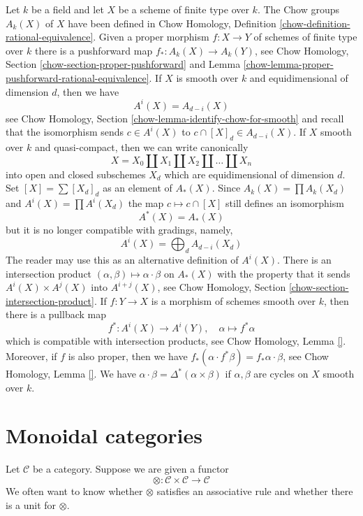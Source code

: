 \medskip\noindent
Let $k$ be a field and let $X$ be a scheme of finite type over $k$.
The Chow groups $A_k(X)$ of $X$ have been defined in
Chow Homology, Definition \ref{chow-definition-rational-equivalence}.
Given a proper morphism $f : X \to Y$ of schemes of finite
type over $k$ there is a pushforward map $f_* : A_k(X) \to A_k(Y)$,
see Chow Homology, Section \ref{chow-section-proper-pushforward} and
Lemma \ref{chow-lemma-proper-pushforward-rational-equivalence}.
If $X$ is smooth over $k$ and equidimensional of dimension $d$, then
we have
$$
A^i(X) = A_{d - i}(X)
$$
see Chow Homology, Section \ref{chow-lemma-identify-chow-for-smooth}
and recall that the isomorphism sends $c \in A^i(X)$ to
$c \cap [X]_d \in A_{d - i}(X)$.
If $X$ smooth over $k$ and quasi-compact, then we can write canonically
$$
X = X_0 \amalg X_1 \amalg X_2 \amalg \ldots \amalg X_n
$$
into open and closed subschemes $X_d$ which are
equidimensional of dimension $d$. Set $[X] = \sum [X_d]_d$
as an element of $A_*(X)$. Since
$A_k(X) = \prod A_k(X_d)$ and $A^i(X) = \prod A^i(X_d)$
the map $c \mapsto c \cap [X]$ still defines an isomorphism
$$
A^*(X) = A_*(X)
$$
but it is no longer compatible with gradings, namely,
$$
A^i(X) = \bigoplus\nolimits_d A_{d - i}(X_d)
$$
The reader may use this as an alternative definition of $A^i(X)$.
There is an intersection product
$(\alpha, \beta) \mapsto \alpha \cdot \beta$ on $A_*(X)$
with the property that it sends $A^i(X) \times A^j(X)$ into $A^{i + j}(X)$,
see Chow Homology, Section \ref{chow-section-intersection-product}.
If $f : Y \to X$ is a morphism of schemes smooth over $k$, then
there is a pullback map
$$
f^* : A^i(X) \to A^i(Y),\quad
\alpha \mapsto f^*\alpha
$$
which is compatible with intersection products, see
Chow Homology, Lemma \ref{}.
Moreover, if $f$ is also proper, then
we have $f_*(\alpha \cdot f^*\beta) = f_*\alpha \cdot \beta$, see
Chow Homology, Lemma \ref{}.
We have $\alpha \cdot \beta = \Delta^*(\alpha \times \beta)$
if $\alpha, \beta$ are cycles on $X$ smooth over $k$.






\section{Monoidal categories}
\label{section-monoidal}

\noindent
Let $\mathcal{C}$ be a category. Suppose we are given a functor
$$
\otimes : \mathcal{C} \times \mathcal{C} \longrightarrow \mathcal{C}
$$
We often want to know whether $\otimes$ satisfies an associative rule
and whether there is a unit for $\otimes$.

